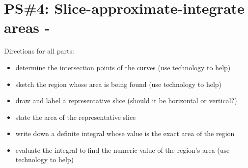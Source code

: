 


%


\allowdisplaybreaks
\section{PS\#4: Slice-approximate-integrate areas -  }

Directions for all parts:
\begin{itemize}
    \item determine the intersection points of the curves (use technology to help)
    \item sketch the region whose area is being found (use technology to help)
    \item draw and label a representative slice (should it be horizontal or vertical?)
    \item state the area of the representative slice
    \item write down a definite integral whose value is the exact area of the region
    \item evaluate the integral to find the numeric value of the region's area (use technology to help)
\end{itemize}

